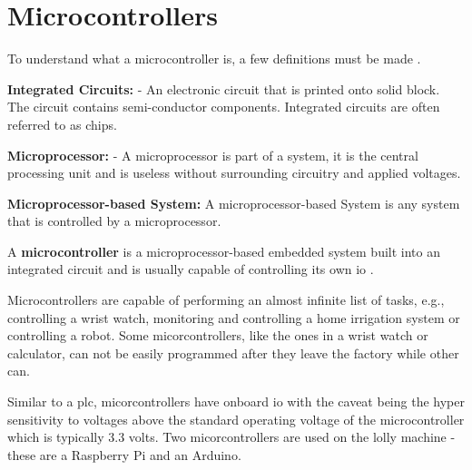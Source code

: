 \section{Microcontrollers}
    To understand what a microcontroller is, a few definitions must be made \cite{crisp2003introduction}.
    
\begin{description}
    \item{\textbf{Integrated Circuits:}} - An electronic circuit that is printed onto solid block. The circuit contains semi-conductor components. Integrated circuits are often referred to as chips.
    \item{\textbf{Microprocessor:}} - A microprocessor is part of a system, it is the central processing unit and is useless without surrounding circuitry and applied voltages.
    \item{\textbf{Microprocessor-based System:}} A microprocessor-based System is any system that is controlled by a microprocessor. 
\end{description}    
    
    A \textbf{microcontroller} is a microprocessor-based embedded system built into an integrated circuit and is usually capable of controlling its own \acrshort{io} \cite{crisp2003introduction}.
    
    Microcontrollers are capable of performing an almost infinite list of tasks, e.g., controlling a wrist watch, monitoring and controlling a home irrigation system or controlling a robot. Some micorcontrollers, like the ones in a wrist watch or calculator,  can not be easily programmed after they leave the factory while other can.
    
    Similar to a \acrshort{plc}, micorcontrollers have onboard \acrshort{io} with the caveat being the hyper sensitivity to voltages above the standard operating voltage of the microcontroller which is typically 3.3 volts. Two micorcontrollers are used on the lolly machine - these are a Raspberry Pi and an Arduino.  
  
